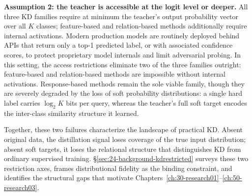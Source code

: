 \begin{foldable}
  \textbf{Assumption 2: the teacher is accessible at the logit level or deeper.}
  All three \ac{KD} families require at minimum the teacher's output probability vector over all $K$ classes; feature-based and relation-based methods additionally require internal activations.
  Modern production models are routinely deployed behind \acp{API} that return only a top-1 predicted label, or with associated confidence scores, to protect proprietary model internals and limit adversarial probing.
  In this setting, the access restrictions eliminate two of the three families outright: feature-based and relation-based methods are impossible without internal activations.
  Response-based methods remain the sole viable family, though they are severely degraded by the loss of soft probability distributions: a single hard label carries $\log_2 K$ bits per query, whereas the teacher's full soft target encodes the inter-class similarity structure it learned.
\end{foldable}

\begin{foldable}
  Together, these two failures characterize the landscape of practical \ac{KD}.
  Absent original data, the distillation signal loses coverage of the true input distribution; absent soft targets, it loses the relational structure that distinguishes \ac{KD} from ordinary supervised training.
  \S\ref{sec:24-background-kdrestricted} surveys these two restriction axes, frames distributional fidelity as the binding constraint, and identifies the structural gaps that motivate Chapters~\ref{ch:30-research01}--\ref{ch:50-research03}.
\end{foldable}

